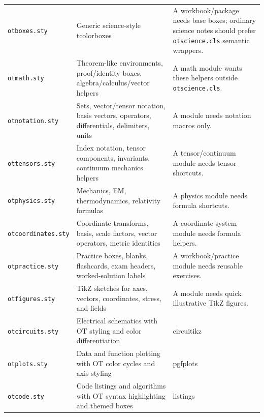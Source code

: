 \documentclass[10pt,a4paper]{article}
\newcommand{\pkg}[1]{\texttt{#1}}
\begin{document}
\begin{longtable}{p{}p{}p{}}
  \pkg{otboxes.sty}       & Generic science-style tcolorboxes                                                        & A workbook/package needs base boxes; ordinary science notes should prefer \pkg{otscience.cls} semantic wrappers. \\
  \pkg{otmath.sty}        & Theorem-like environments, proof/identity boxes, algebra/calculus/vector helpers         & A math module wants these helpers outside \pkg{otscience.cls}.                                                   \\
  \pkg{otnotation.sty}    & Sets, vector/tensor notation, basis vectors, operators, differentials, delimiters, units & A module needs notation macros only.                                                                             \\
  \pkg{ottensors.sty}     & Index notation, tensor components, invariants, continuum mechanics helpers               & A tensor/continuum module needs tensor shortcuts.                                                                \\
  \pkg{otphysics.sty}     & Mechanics, EM, thermodynamics, relativity formulas                                       & A physics module needs formula shortcuts.                                                                        \\
  \pkg{otcoordinates.sty} & Coordinate transforms, basis, scale factors, vector operators, metric identities         & A coordinate-system module needs formula helpers.                                                                \\
  \pkg{otpractice.sty}    & Practice boxes, blanks, flashcards, exam headers, worked-solution labels                 & A workbook/practice module needs reusable exercises.                                                             \\
  \pkg{otfigures.sty}     & TikZ sketches for axes, vectors, coordinates, stress, and fields                         & A module needs quick illustrative TikZ figures.                                                                  \\
  \pkg{otcircuits.sty}    & Electrical schematics with OT styling and color differentiation                          & circuitikz \\
  \pkg{otplots.sty}       & Data and function plotting with OT color cycles and axis styling                         & pgfplots \\
  \pkg{otcode.sty}        & Code listings and algorithms with OT syntax highlighting and themed boxes                & listings \\

\end{longtable}
\end{document}
